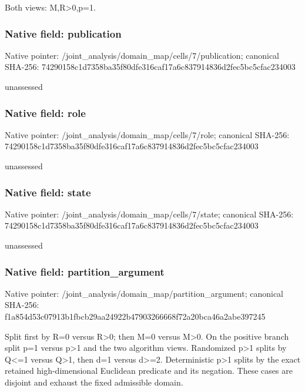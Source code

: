 \documentclass[10pt,a4paper]{article}
\begin{document}
\begingroup\raggedright\sloppy Both views:\allowbreak{} M,\allowbreak{}R>0,\allowbreak{}p=\allowbreak{}1.\par\endgroup

\subsubsection{Native field: publication}
Native pointer: /joint\_\allowbreak{}analysis/domain\_\allowbreak{}map/cells/7/publication; canonical SHA-256: 74290158c1d7358ba35f80dfe316caf17a6c837914836d2fec5bc5cfac234003

\begingroup\raggedright\sloppy unassessed\par\endgroup

\subsubsection{Native field: role}
Native pointer: /joint\_\allowbreak{}analysis/domain\_\allowbreak{}map/cells/7/role; canonical SHA-256: 74290158c1d7358ba35f80dfe316caf17a6c837914836d2fec5bc5cfac234003

\begingroup\raggedright\sloppy unassessed\par\endgroup

\subsubsection{Native field: state}
Native pointer: /joint\_\allowbreak{}analysis/domain\_\allowbreak{}map/cells/7/state; canonical SHA-256: 74290158c1d7358ba35f80dfe316caf17a6c837914836d2fec5bc5cfac234003

\begingroup\raggedright\sloppy unassessed\par\endgroup

\subsubsection{Native field: partition\_\allowbreak{}argument}
Native pointer: /joint\_\allowbreak{}analysis/domain\_\allowbreak{}map/partition\_\allowbreak{}argument; canonical SHA-256: f1a854d53c07913b1fbcb29aa24922b47903266668f72a20bca46a2abe397245

\begingroup\raggedright\sloppy Split first by R=\allowbreak{}0 versus R>0;\allowbreak{} then M=\allowbreak{}0 versus M>0. On the positive branch split p=\allowbreak{}1 versus p>1 and the two algorithm views. Randomized p>1 splits by Q<=\allowbreak{}1 versus Q>1,\allowbreak{} then d=\allowbreak{}1 versus d>=\allowbreak{}2. Deterministic p>1 splits by the exact retained high-dimensional Euclidean predicate and its negation. These cases are disjoint and exhaust the fixed admissible domain.\par\endgroup
\end{document}
